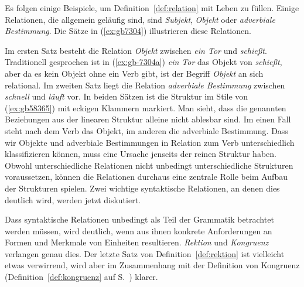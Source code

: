 
Es folgen einige Beispiele, um Definition~\ref{def:relation} mit Leben zu füllen.
Einige Relationen, die allgemein geläufig sind, sind \textit{Subjekt}, \textit{Objekt} oder \textit{adverbiale Bestimmung}.
Die Sätze in (\ref{ex:gb7304}) illustrieren diese Relationen.

\begin{exe}
  \ex\label{ex:gb7304}
  \begin{xlist}
  \end{xlist}
\end{exe}

Im ersten Satz besteht die Relation \textit{Objekt} zwischen \textit{ein Tor} und \textit{schießt}.
Traditionell gesprochen ist in (\ref{ex:gb-7304a}) \textit{ein Tor} das Objekt von \textit{schießt}, aber da es kein Objekt ohne ein Verb gibt, ist der Begriff \textit{Objekt} an sich relational.
Im zweiten Satz liegt die Relation \textit{adverbiale Bestimmung} zwischen \textit{schnell} und \textit{läuft} vor.
In beiden Sätzen ist die Struktur im Stile von (\ref{ex:gb58365}) mit eckigen Klammern markiert.
Man sieht, dass die genannten Beziehungen aus der linearen Struktur alleine nicht ablesbar sind.
Im einen Fall steht nach dem Verb das Objekt, im anderen die adverbiale Bestimmung.
Dass wir Objekte und adverbiale Bestimmungen in Relation zum Verb unterschiedlich klassifizieren können, muss eine Ursache jenseits der reinen Struktur haben.
Obwohl unterschiedliche Relationen nicht unbedingt unterschiedliche Strukturen voraussetzen, können die Relationen durchaus eine zentrale Rolle beim Aufbau der Strukturen spielen.
Zwei wichtige syntaktische Relationen, an denen dies deutlich wird, werden jetzt diskutiert.

Dass syntaktische Relationen unbedingt als Teil der Grammatik betrachtet werden müssen, wird deutlich, wenn aus ihnen konkrete Anforderungen an Formen und Merkmale von Einheiten resultieren.
\textit{Rektion} und \textit{Kongruenz} verlangen genau dies.
Der letzte Satz von Definition~\ref{def:rektion} ist vielleicht etwas verwirrend, wird aber im Zusammenhang mit der Definition von Kongruenz (Definition~\ref{def:kongruenz} auf S.~\pageref{def:kongruenz}) klarer.

